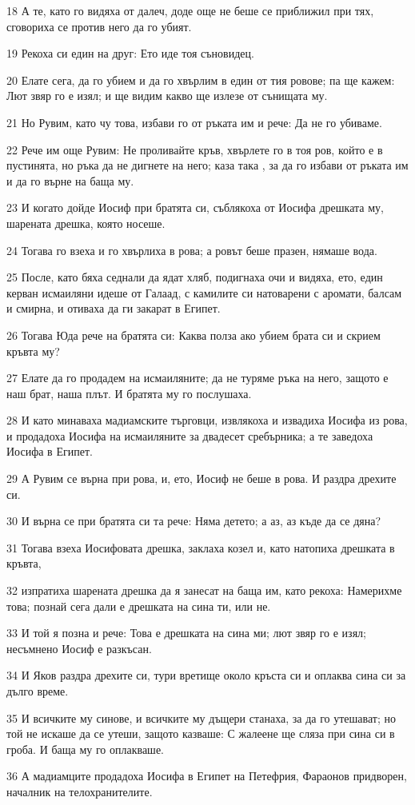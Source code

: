\par 18 А те, като го видяха от далеч, доде още не беше се приближил при тях, сговориха се против него да го убият.
\par 19 Рекоха си един на друг: Ето иде тоя съновидец.
\par 20 Елате сега, да го убием и да го хвърлим в един от тия ровове; па ще кажем: Лют звяр го е изял; и ще видим какво ще излезе от сънищата му.
\par 21 Но Рувим, като чу това, избави го от ръката им и рече: Да не го убиваме.
\par 22 Рече им още Рувим: Не проливайте кръв, хвърлете го в тоя ров, който е в пустинята, но ръка да не дигнете на него; каза така , за да го избави от ръката им и да го върне на баща му.
\par 23 И когато дойде Иосиф при братята си, съблякоха от Иосифа дрешката му, шарената дрешка, която носеше.
\par 24 Тогава го взеха и го хвърлиха в рова; а ровът беше празен, нямаше вода.
\par 25 После, като бяха седнали да ядат хляб, подигнаха очи и видяха, ето, един керван исмаиляни идеше от Галаад, с камилите си натоварени с аромати, балсам и смирна, и отиваха да ги закарат в Египет.
\par 26 Тогава Юда рече на братята си: Каква полза ако убием брата си и скрием кръвта му?
\par 27 Елате да го продадем на исмаиляните; да не туряме ръка на него, защото е наш брат, наша плът. И братята му го послушаха.
\par 28 И като минаваха мадиамските търговци, извлякоха и извадиха Иосифа из рова, и продадоха Иосифа на исмаиляните за двадесет сребърника; а те заведоха Иосифа в Египет.
\par 29 А Рувим се върна при рова, и, ето, Иосиф не беше в рова. И раздра дрехите си.
\par 30 И върна се при братята си та рече: Няма детето; а аз, аз къде да се дяна?
\par 31 Тогава взеха Иосифовата дрешка, заклаха козел и, като натопиха дрешката в кръвта,
\par 32 изпратиха шарената дрешка да я занесат на баща им, като рекоха: Намерихме това; познай сега дали е дрешката на сина ти, или не.
\par 33 И той я позна и рече: Това е дрешката на сина ми; лют звяр го е изял; несъмнено Иосиф е разкъсан.
\par 34 И Яков раздра дрехите си, тури вретище около кръста си и оплаква сина си за дълго време.
\par 35 И всичките му синове, и всичките му дъщери станаха, за да го утешават; но той не искаше да се утеши, защото казваше: С жалеене ще сляза при сина си в гроба. И баща му го оплакваше.
\par 36 А мадиамците продадоха Иосифа в Египет на Петефрия, Фараонов придворен, началник на телохранителите.

